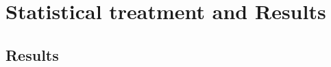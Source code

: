 \clearpage{\pagestyle{empty}\cleardoublepage}

\chapter{Statistical treatment and Results}\label{chap:results}







\section{Results}\label{sec:results}
